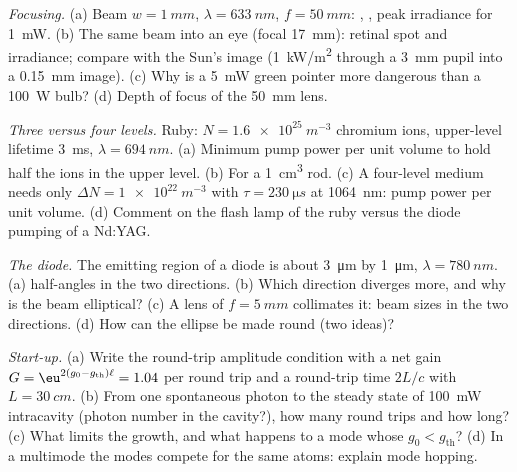 \begin{exercise}[$\star\star$]\label{exo:b2:laser:8}
\emph{Focusing.} (a) Beam $w = \qty{1}{mm}$, $\lambda = \qty{633}{nm}$,
$f = \qty{50}{mm}$: , , peak irradiance for
\qty{1}{mW}. (b) The same beam into an eye (focal \qty{17}{mm}):
retinal spot and irradiance; compare with the Sun's image
(\qty{1}{kW/m^2} through a \qty{3}{mm} pupil into a \qty{0.15}{mm}
image). (c) Why is a \qty{5}{mW} green pointer more dangerous than a
\qty{100}{W} bulb? (d) Depth of focus of the \qty{50}{mm} lens.
\end{exercise}

\begin{exercise}[$\star\star$]\label{exo:b2:laser:9}
\emph{Three versus four levels.} Ruby: $N = \qty{1.6e25}{m^{-3}}$
chromium ions, upper-level lifetime \qty{3}{ms}, $\lambda =
\qty{694}{nm}$. (a) Minimum pump power per unit volume to hold half the
ions in the upper level. (b) For a \qty{1}{cm^3} rod. (c) A four-level
medium needs only $\Delta N = \qty{1e22}{m^{-3}}$ with $\tau =
\qty{230}{\micro s}$ at \qty{1064}{nm}: pump power per unit volume. (d) Comment on the
flash lamp of the ruby  versus the diode pumping of a Nd:YAG.
\end{exercise}

\begin{exercise}[$\star\star\star$]\label{exo:b2:laser:10}
\emph{The  diode.} The emitting region of a diode  is about
\qty{3}{\micro m} by \qty{1}{\micro m}, $\lambda = \qty{780}{nm}$. (a)
 half-angles in the two directions. (b) Which direction
diverges more, and why is the beam elliptical? (c) A lens of $f =
\qty{5}{mm}$ collimates it: beam sizes in the two directions. (d) How
can the ellipse be made round (two ideas)?
\end{exercise}

\begin{exercise}[$\star\star\star$]\label{exo:b2:laser:11}
\emph{Start-up.} (a) Write the round-trip amplitude condition with a
net gain $G = \eu^{2(g_0 - g_{\text{th}})\ell} = 1.04$ per round trip
and a round-trip time $2L/c$ with $L = \qty{30}{cm}$. (b) From one
spontaneous photon to the steady state of \qty{100}{mW} intracavity
(photon number in the cavity?), how many round trips and how long?
(c) What limits the growth, and what happens to a mode whose
$g_0 < g_{\text{th}}$? (d) In a multimode  the modes compete for
the same atoms: explain mode hopping.
\end{exercise}

